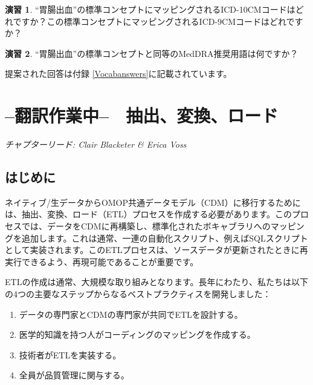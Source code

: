 \documentclass[
  11pt]{book}
\providecommand{\tightlist}{%
  \setlength{\itemsep}{0pt}\setlength{\parskip}{0pt}}
\theoremstyle{definition}
\theoremstyle{definition}
\theoremstyle{definition}
\newtheorem{exercise}{演習}[chapter]
\theoremstyle{definition}
\theoremstyle{remark}
\begin{document}
\begin{exercise}
\protect\hypertarget{exr:exerciseVocab2}{}\label{exr:exerciseVocab2}``胃腸出血''の標準コンセプトにマッピングされるICD-10CMコードはどれですか？この標準コンセプトにマッピングされるICD-9CMコードはどれですか？
\end{exercise}

\begin{exercise}
\protect\hypertarget{exr:exerciseVocab3}{}\label{exr:exerciseVocab3}``胃腸出血''の標準コンセプトと同等のMedDRA推奨用語は何ですか？
\end{exercise}

提案された回答は付録 \ref{Vocabanswers}に記載されています。

\chapter{--翻訳作業中--　抽出、変換、ロード}\label{ExtractTransformLoad}

\emph{チャプターリード: Clair Blacketer \& Erica Voss}

\section{はじめに}\label{ux306fux3058ux3081ux306b}

ネイティブ/生データからOMOP共通データモデル（CDM）に移行するためには、抽出、変換、ロード（ETL）プロセスを作成する必要があります。このプロセスでは、データをCDMに再構築し、標準化されたボキャブラリへのマッピングを追加します。これは通常、一連の自動化スクリプト、例えばSQLスクリプトとして実装されます。このETLプロセスは、ソースデータが更新されたときに再実行できるよう、再現可能であることが重要です。   

ETLの作成は通常、大規模な取り組みとなります。長年にわたり、私たちは以下の4つの主要なステップからなるベストプラクティスを開発しました：

\begin{enumerate}
\def\labelenumi{\arabic{enumi}.}
\tightlist
\item
  データの専門家とCDMの専門家が共同でETLを設計する。
\item
  医学的知識を持つ人がコーディングのマッピングを作成する。
\item
  技術者がETLを実装する。
\item
  全員が品質管理に関与する。
\end{enumerate}
\end{document}
